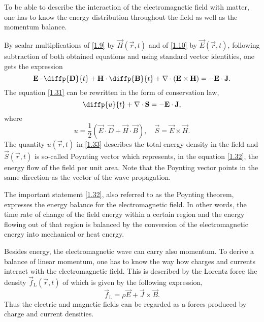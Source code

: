 To be able to describe the interaction of the electromagnetic field with matter, one has to know the energy distribution throughout the field as well as the momentum balance.

By scalar multiplications of \ref{1.9} by $ \vec{H}\left( \vec{r}, t \right) $ and of \ref{1.10} by $ \vec{E}\left( \vec{r}, t \right) $, following subtraction of both obtained equations and using standard vector identities, one gets the expression 
\begin{equation}
\label{1.31}
\vec{E} \cdot \diffp{\vec{D}}{t} + \vec{H} \cdot \diffp{\vec{B}}{t} + \div{\left(\vec{E} \times \vec{H} \right)} = -\vec{E} \cdot \vec{J}.
\end{equation}
The equation \ref{1.31} can be rewritten in the form of conservation law,
\begin{equation}
\label{1.32}
\diffp{u}{t} + \div{\vec{S}} = - \vec{E} \cdot \vec{J},
\end{equation}
where
\begin{equation}
\label{1.33}
u = \frac{1}{2} \left(\vec{E} \cdot \vec{D} + \vec{H} \cdot \vec{B} \right), \quad \vec{S} = \vec{E} \times \vec{H}.
\end{equation}
The quantity $ u\left( \vec{r}, t \right) $ in \ref{1.33} describes the total energy density in the field and $ \vec{S}\left( \vec{r}, t \right) $ is so-called Poynting vector which represents, in the equation \ref{1.32}, the energy flow of the field per unit area. Note that the Poynting vector points in the same direction as the vector of the wave propagation.

The important statement \ref{1.32}, also referred to as the Poynting theorem, expresses the energy balance for the electromagnetic field. In other words, the time rate of change of the field energy within a certain region and the energy flowing out of that region is balanced by the conversion of the electromagnetic energy into mechanical or heat energy.

Besides energy, the electromagnetic wave can carry also momentum. To derive a balance of linear momentum, one has to know the way how charges and currents interact with the electromagnetic field. This is described by the Lorentz force the density $ \vec{f}_\mathrm{L} \left( \vec{r}, t \right) $ of which is given by the following expression,
\begin{equation}
\label{1.51}
\vec{f}_\mathrm{L} = \rho \vec{E} + \vec{J} \times \vec{B}.
\end{equation}
Thus the electric and magnetic fields can be regarded as a forces produced by charge and current densities.


